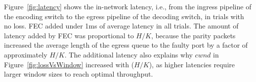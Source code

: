 Figure~\ref{fig:latency} shows the in-network latency, i.e., from the  ingress
pipeline of the encoding switch to the egress pipeline of the  decoding
switch, in trials with no loss. FEC added under 1ms of average latency in  all
trials. The amount of latency added by FEC was proportional to $H/K$,  because
the parity packets increased the average length of the egress queue to the
faulty port  by a factor of approximately $H/K$. The additional latency  also
explains why $cwnd$ in Figure~\ref{fig:lossVsWindow} increased with ($H/K$),
as higher latencies require larger window sizes to reach optimal throughput.













